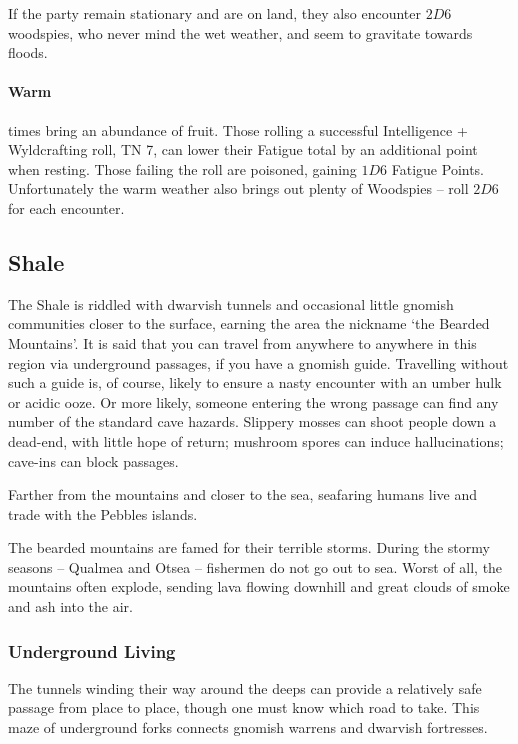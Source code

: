 \begin{multicols}{2}
{If the party remain stationary and are on land, they also encounter $2D6$ woodspies, who never mind the wet weather, and seem to gravitate towards floods.

\paragraph{Warm} times bring an abundance of fruit.
Those rolling a successful Intelligence + Wyldcrafting roll, TN 7, can lower their Fatigue total by an additional point when resting.
Those failing the roll are poisoned, gaining $1D6$ Fatigue Points.
Unfortunately the warm weather also brings out plenty of Woodspies -- roll $2D6$ for each encounter.

}

\subsection{Shale}


The Shale is riddled with dwarvish tunnels and occasional little gnomish communities closer to the surface, earning the area the nickname `the Bearded Mountains'.
It is said that you can travel from anywhere to anywhere in this region via underground passages, if you have a gnomish guide.
Travelling without such a guide is, of course, likely to ensure a nasty encounter with an umber hulk or acidic ooze.
Or more likely, someone entering the wrong passage can find any number of the standard cave hazards.
Slippery mosses can shoot people down a dead-end, with little hope of return; mushroom spores can induce hallucinations; cave-ins can block passages.

Farther from the mountains and closer to the sea, seafaring humans live and trade with the Pebbles islands.

The bearded mountains are famed for their terrible storms.
During the stormy seasons -- Qualmea and Otsea -- fishermen do not go out to sea.
Worst of all, the mountains often explode, sending lava flowing downhill and great clouds of smoke and ash into the air.

\subsubsection{Underground Living}

The tunnels winding their way around the deeps can provide a relatively safe passage from place to place, though one must know which road to take.
This maze of underground forks connects gnomish warrens and dwarvish fortresses.


\end{multicols}
